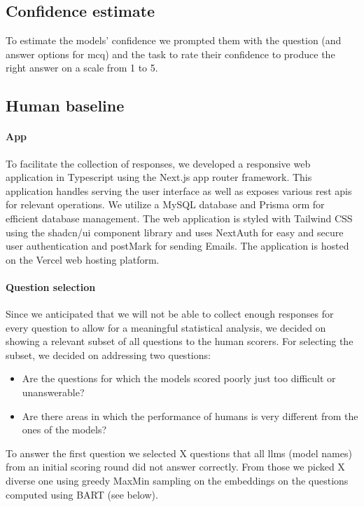 \documentclass[11pt, oneside]{article}
\begin{document}
\begin{refsection}
\subsection{Confidence estimate}
To estimate the models' confidence we prompted them with the question (and answer options for \gls{mcq}) and the task to rate their confidence to produce the right answer on a scale from 1 to 5. 

\subsection{Human baseline}

\paragraph{App} To facilitate the collection of responses, we developed a responsive web application in Typescript using the Next.js\autocite{nextjs} app router framework.
This application handles serving the user interface as well as exposes various \gls{rest} \glspl{api} for relevant operations.
We utilize a MySQL\autocite{mysql} database and Prisma \gls{orm}\autocite{prisma} for efficient database management.
The web application is styled with Tailwind CSS\autocite{tailwindcss} using the shadcn/ui component library and uses NextAuth\autocite{nextauth} for easy and secure user authentication and postMark for sending Emails.
The application is hosted on the Vercel web hosting platform.

\paragraph{Question selection} \label{sec:subset-selection}
Since we anticipated that we will not be able to collect enough responses for every question to allow for a meaningful statistical analysis, we decided on showing a relevant subset of all questions to the human scorers.
For selecting the subset, we decided on addressing two questions:
\begin{itemize}
    \item Are the questions for which the models scored poorly just too difficult or unanswerable?
    \item Are there areas in which the performance of humans is very different from the ones of the models?
\end{itemize}
To answer the first question we selected X questions that all \glspl{llm} (model names) from an initial scoring round did not answer correctly.
From those we picked X diverse one using greedy MaxMin sampling on the embeddings on the questions computed using BART (see below).



\end{refsection}
\end{document}

